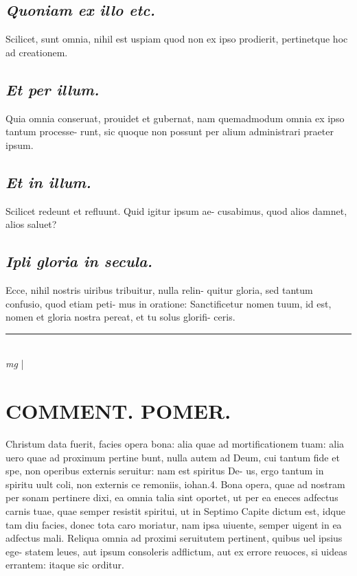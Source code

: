 \documentclass{article}
\begin{document}
\begin{pages}
\subsection*{\textit{Quoniam ex illo etc. }}\pstart Scilicet, sunt omnia, nihil est uspiam quod non ex ipso prodierit, pertinetque hoc ad creationem.   \pend
{}
{}
\subsection*{\textit{Et per illum. }}\pstart Quia omnia conseruat, prouidet et gubernat, nam quemadmodum omnia ex ipso tantum processe- runt, sic quoque non possunt per alium administrari praeter ipsum.   \pend
{}
{}
\subsection*{\textit{Et in illum. }}\pstart Scilicet redeunt et refluunt. Quid igitur ipsum ae- cusabimus, quod alios damnet, alios saluet?  \pend
{}
{}
\subsection*{\textit{Ipli gloria in secula. }}\pstart Ecce, nihil nostris uiribus tribuitur, nulla relin- quitur gloria, sed tantum confusio, quod etiam peti- mus in oratione: Sanctificetur nomen tuum, id est, nomen et gloria nostra pereat, et tu solus glorifi- ceris.   \pend
\marginpar{[ p.]}\pstart  \pend\pstart  \pend
\vspace{0.5cm}\noindent
\vspace{0.2cm}\rule{1cm}{0.2pt}\\ 
\hspace{0.2cm}\textit{mg}
\footnotesize 
\normalsize| 
\section*{COMMENT. POMER.  }\pstart Christum data fuerit, facies opera bona: alia quae ad mortificationem tuam: alia uero quae ad proximum pertine bunt, nulla autem ad Deum, cui tantum fide et spe, non operibus externis seruitur: nam est spiritus De- us, ergo tantum in spiritu uult coli, non externis ce remoniis, iohan.4. Bona opera, quae ad nostram per sonam pertinere dixi, ea omnia talia sint oportet, ut per ea eneces adfectus carnis tuae, quae semper resistit spiritui, ut in Septimo Capite dictum est, idque tam diu facies, donec tota caro moriatur, nam ipsa uiuente, semper uigent in ea adfectus mali. Reliqua omnia ad proximi seruitutem pertinent, quibus uel ipsius ege- statem leues, aut ipsum consoleris adflictum, aut ex errore reuoces, si uideas errantem: itaque sic orditur.  \pend
{}
{}

\end{pages}
\end{document}

